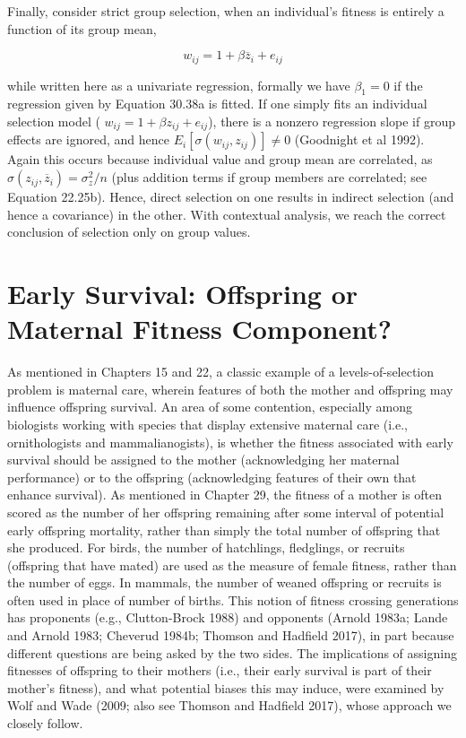 \documentclass{article}
\begin{document}
Finally, consider strict group selection, when an individual’s fitness is entirely a function of its group mean,

\begin{equation}
w_{ij}=1+\beta\overline{z}_{i}+e_{ij}
\tag{30.39b}
\label{eq:30_39b}
\end{equation}

while written here as a univariate regression, formally we have  $ \beta_1 = 0 $ if the regression given by Equation 30.38a is fitted. If one simply fits an individual selection model ( $ w_{ij} = 1 + \beta z_{ij} + e_{ij} $), there is a nonzero regression slope if group effects are ignored, and hence  $ E_i[\sigma(w_{ij}, z_{ij})] \neq 0 $ (Goodnight et al 1992). Again this occurs because individual value and group mean are correlated, as  $ \sigma(z_{ij}, \overline{z}_i) = \sigma_z^2 / n $ (plus addition terms if group members are correlated; see Equation 22.25b). Hence, direct selection on one results in indirect selection (and hence a covariance) in the other. With contextual analysis, we reach the correct conclusion of selection only on group values.

\section{Early Survival: Offspring or Maternal Fitness Component?}
As mentioned in Chapters 15 and 22, a classic example of a levels-of-selection problem is maternal care, wherein features of both the mother and offspring may influence offspring survival. An area of some contention, especially among biologists working with species that display extensive maternal care (i.e., ornithologists and mammalianogists), is whether the fitness associated with early survival should be assigned to the mother (acknowledging her maternal performance) or to the offspring (acknowledging features of their own that enhance survival). As mentioned in Chapter 29, the fitness of a mother is often scored as the number of her offspring remaining after some interval of potential early offspring mortality, rather than simply the total number of offspring that she produced. For birds, the number of hatchlings, fledglings, or recruits (offspring that have mated) are used as the measure of female fitness, rather than the number of eggs. In mammals, the number of weaned offspring or recruits is often used in place of number of births. This notion of fitness crossing generations has proponents (e.g., Clutton-Brock 1988) and opponents (Arnold 1983a; Lande and Arnold 1983; Cheverud 1984b; Thomson and Hadfield 2017), in part because different questions are being asked by the two sides. The implications of assigning fitnesses of offspring to their mothers (i.e., their early survival is part of their mother's fitness), and what potential biases this may induce, were examined by Wolf and Wade (2009; also see Thomson and Hadfield 2017), whose approach we closely follow.
\end{document}
